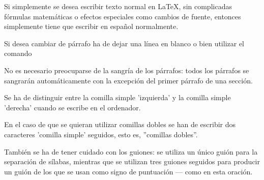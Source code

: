 Si simplemente se desea escribir texto normal en LaTeX,
sin complicadas f\'ormulas matem\'aticas o efectos especiales
como cambios de fuente, entonces simplemente tiene que escribir
en español normalmente. \par
Si desea cambiar de p\'arrafo ha de dejar una l\'inea en blanco o bien
utilizar el comando \par
No es necesario preocuparse de la sangr\'ia de los p\'arrafos:
todos los p\'arrafos se sangrar\'an autom\'aticamente con la excepci\'on
del primer p\'arrafo de una secci\'on. 

Se ha de distinguir entre la comilla simple 'izquierda'
y la comilla simple 'derecha' cuando se escribe en el ordenador. 

En el caso de que se quieran utilizar comillas dobles se han de 
escribir dos caracteres 'comilla simple' seguidos, esto es, 
''comillas dobles''.

Tambi\'en se ha de tener cuidado con los guiones: se utiliza un \'unico
gui\'on para la separaci\'on de s\'ilabas, mientras que se utilizan
tres guiones seguidos para producir un gui\'on de los que se usan
como signo de puntuaci\'on --- como en esta oraci\'on. 


